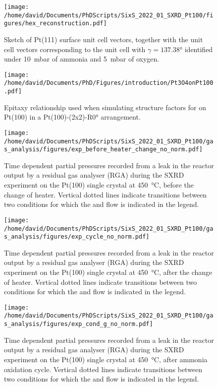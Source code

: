 
\begin{figure}[!htb]
    \centering
    \texttt{[image: /home/david/Documents/PhDScripts/SixS\_2022\_01\_SXRD\_Pt100/figures/hex\_reconstruction.pdf]}
    \caption{
    Sketch of Pt(111) surface unit cell vectors, together with the unit cell vectors corresponding to the unit cell with $\gamma=\ang{137.38}$ identified under \qty{10}{\milli\bar} of ammonia and \qty{5}{\milli\bar} of oxygen.
    }
    \label{fig:Pt100UnitCellsReconstruction}
\end{figure}

\begin{figure}[!htb]
    \centering
    \texttt{[image: /home/david/Documents/PhD/Figures/introduction/Pt3O4onPt100.pdf]}
    \caption{
    Epitaxy relationship used when simulating structure factors for  on Pt(100) in a Pt(100)-(2x2)-R\ang{0} arrangement.
    }
    \label{fig:Pt3O4onPt100}
\end{figure}

\begin{figure}[!htb]
    \centering
    \texttt{[image: /home/david/Documents/PhDScripts/SixS\_2022\_01\_SXRD\_Pt100/gas\_analysis/figures/exp\_before\_heater\_change\_no\_norm.pdf]}
    \caption{
        Time dependent partial pressures recorded from a leak in the reactor output by a residual gas analyser (RGA) during the SXRD experiment on the Pt(100) single crystal at \qty{450}{\degreeCelsius}, before the change of heater.
        Vertical dotted lines indicate transitions between two conditions for which the  and  flow is indicated in the legend.
    }
    \label{fig:RGA450Pt100BeforeHeaterChange}
\end{figure}

\begin{figure}[!htb]
    \centering
    \texttt{[image: /home/david/Documents/PhDScripts/SixS\_2022\_01\_SXRD\_Pt100/gas\_analysis/figures/exp\_cycle\_no\_norm.pdf]}
    \caption{
        Time dependent partial pressures recorded from a leak in the reactor output by a residual gas analyser (RGA) during the SXRD experiment on the Pt(100) single crystal at \qty{450}{\degreeCelsius}, after the change of heater.
        Vertical dotted lines indicate transitions between two conditions for which the  and  flow is indicated in the legend.
    }
    \label{fig:RGA450Pt100Cycle}
\end{figure}

\begin{figure}[!htb]
    \centering
    \texttt{[image: /home/david/Documents/PhDScripts/SixS\_2022\_01\_SXRD\_Pt100/gas\_analysis/figures/exp\_cond\_g\_no\_norm.pdf]}
    \caption{
        Time dependent partial pressures recorded from a leak in the reactor output by a residual gas analyser (RGA) during the SXRD experiment on the Pt(100) single crystal at \qty{450}{\degreeCelsius}, after ammonia oxidation cycle.
        Vertical dotted lines indicate transitions between two conditions for which the  and  flow is indicated in the legend.
    }
    \label{fig:RGA450Pt100CondG}
\end{figure}